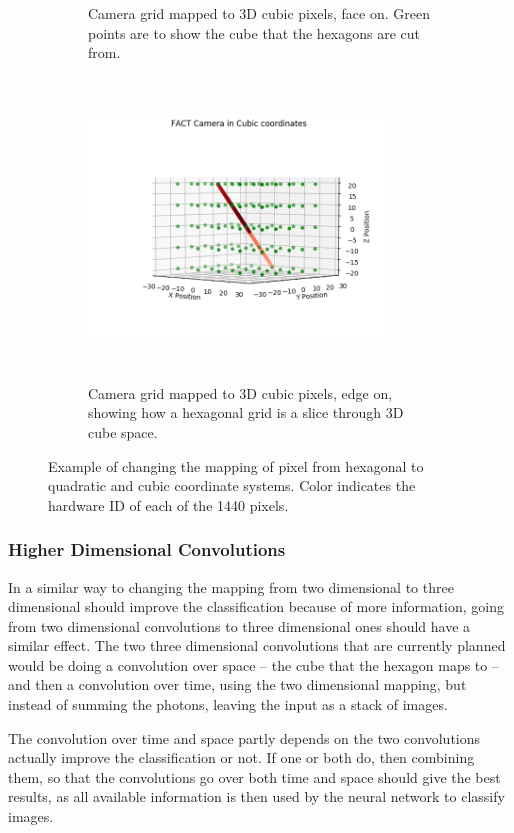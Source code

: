 \documentclass[12pt]{article}
\begin{document}
\begin{figure}[!htb]
\begin{subfigure}[t]{.475\textwidth}
  \caption{Camera grid mapped to 3D cubic pixels, face on. Green points are to show the cube that the hexagons are cut from.}
  \label{fig:CubeEdge}
\end{subfigure}
\hfill
\begin{subfigure}[t]{.475\textwidth}
  \centering
  \includegraphics[width=8cm, height=8cm, keepaspectratio]{Cubic_Mapping_FACT_Edge.png}
  \caption{Camera grid mapped to 3D cubic pixels, edge on, showing how a hexagonal grid is a slice through 3D cube space.}
  \label{fig:CubeFace}
\end{subfigure}
\caption{Example of changing the mapping of pixel from hexagonal to quadratic and cubic coordinate systems. Color indicates the hardware ID of each of the 1440 pixels.}
\label{fig:gridCompare}
\end{figure}

\subsubsection{Higher Dimensional Convolutions}

In a similar way to changing the mapping from two dimensional to three dimensional should improve the classification because of more information, going from two dimensional convolutions to three dimensional ones should have a similar effect. The two three dimensional convolutions that are currently planned would be doing a convolution over space -- the cube that the hexagon maps to -- and then a convolution over time, using the two dimensional mapping, but instead of summing the photons, leaving the input as a stack of images. 

The convolution over time and space partly depends on the two convolutions actually improve the classification or not. If one or both do, then combining them, so that the convolutions go over both time and space should give the best results, as all available information is then used by the neural network to classify images.
\end{document}
